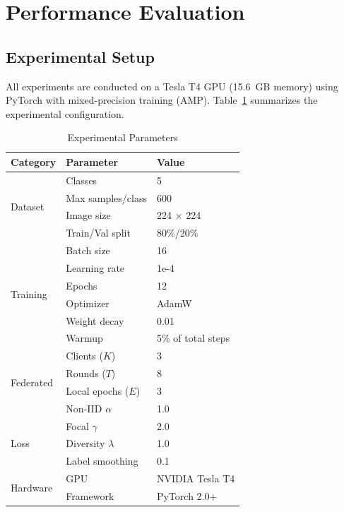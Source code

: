 \documentclass[10pt,journal,compsoc]{IEEEtran}
\begin{document}
\section{Performance Evaluation}
\label{sec:experiments}

\subsection{Experimental Setup}

All experiments are conducted on a Tesla T4 GPU (15.6~GB memory) using PyTorch with mixed-precision training (AMP). Table~\ref{tab:params} summarizes the experimental configuration.

\begin{table}[htbp]
\centering
\caption{Experimental Parameters}
\label{tab:params}
\small
\begin{tabular}{lll}
\toprule
\textbf{Category} & \textbf{Parameter} & \textbf{Value} \\
\midrule
\multirow{4}{*}{Dataset} & Classes & 5 \\
& Max samples/class & 600 \\
& Image size & 224 $\times$ 224 \\
& Train/Val split & 80\%/20\% \\
\midrule
\multirow{6}{*}{Training} & Batch size & 16 \\
& Learning rate & 1e-4 \\
& Epochs & 12 \\
& Optimizer & AdamW \\
& Weight decay & 0.01 \\
& Warmup & 5\% of total steps \\
\midrule
\multirow{4}{*}{Federated} & Clients ($K$) & 3 \\
& Rounds ($T$) & 8 \\
& Local epochs ($E$) & 3 \\
& Non-IID $\alpha$ & 1.0 \\
\midrule
\multirow{3}{*}{Loss} & Focal $\gamma$ & 2.0 \\
& Diversity $\lambda$ & 1.0 \\
& Label smoothing & 0.1 \\
\midrule
\multirow{2}{*}{Hardware} & GPU & NVIDIA Tesla T4 \\
& Framework & PyTorch 2.0+ \\
\bottomrule
\end{tabular}
\end{table}
\end{document}

